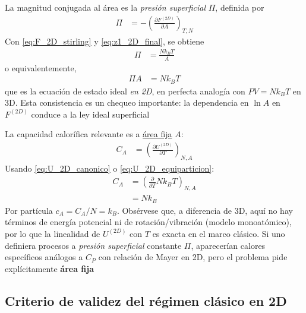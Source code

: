 \documentclass{article}
\begin{document}
La magnitud conjugada al área es la \textit{presión superficial} $\Pi$, definida por
\begin{equation}
\begin{split}
\Pi
&= -\left(\frac{\partial F^{(2D)}}{\partial A}\right)_{T,N}
\end{split}\label{eq:Pi_def}
\end{equation}
Con \eqref{eq:F_2D_stirling} y \eqref{eq:z1_2D_final}, se obtiene
\begin{equation}
\begin{split}
\Pi
&= \frac{N k_B T}{A}
\end{split}\label{eq:Pi_eos}
\end{equation}
o equivalentemente,
\begin{equation}
\begin{split}
\Pi A
&= N k_B T
\end{split}\label{eq:eos_superficial}
\end{equation}
que es la ecuación de estado ideal \textit{en 2D}, en perfecta analogía con $PV=Nk_B T$ en 3D. Esta consistencia es un chequeo importante: la dependencia en $\ln A$ en $F^{(2D)}$ conduce a la ley ideal superficial


La capacidad calorífica relevante es a \underline{área fija} $A$:
\begin{equation}
\begin{split}
C_A
&= \left(\frac{\partial U^{(2D)}}{\partial T}\right)_{N,A}
\end{split}\label{eq:CA_def_2D}
\end{equation}
Usando \eqref{eq:U_2D_canonico} o \eqref{eq:U_2D_equiparticion}:
\begin{equation}
\begin{split}
C_A
&= \left(\frac{\partial}{\partial T} N k_B T\right)_{N,A}\\
&= N k_B
\end{split}\label{eq:CA_resultado}
\end{equation}
Por partícula $c_A=C_A/N=k_B$. Obsérvese que, a diferencia de 3D, aquí no hay términos de energía potencial ni de rotación/vibración (modelo monoatómico), por lo que la linealidad de $U^{(2D)}$ con $T$ es exacta en el marco clásico. Si uno definiera procesos a \textit{presión superficial} constante $\Pi$, aparecerían calores específicos análogos a $C_P$ con relación de Mayer en 2D, pero el problema pide explícitamente \textbf{área fija}

\subsection*{Criterio de validez del régimen clásico en 2D}
\end{document}
